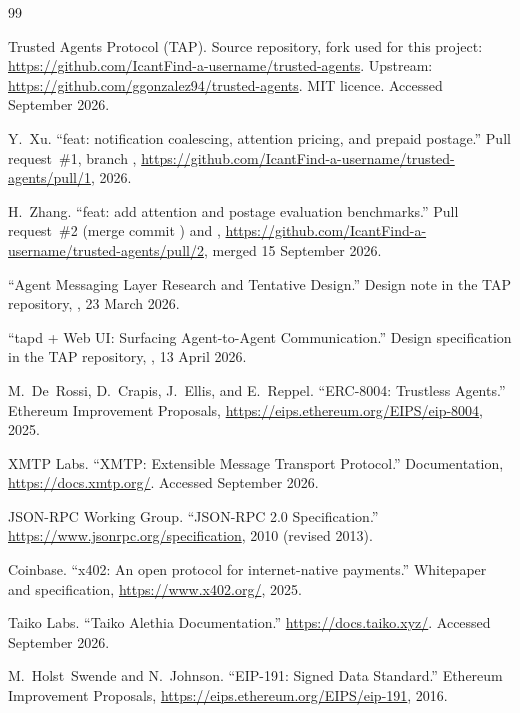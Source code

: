 \begin{thebibliography}{99}
\setlength{\itemsep}{2pt}
\small

Trusted Agents Protocol (TAP). Source repository, fork used for this project:
\url{https://github.com/IcantFind-a-username/trusted-agents}. Upstream:
\url{https://github.com/ggonzalez94/trusted-agents}. MIT licence. Accessed September 2026.

Y.~Xu. ``feat: notification coalescing, attention pricing, and prepaid postage.'' Pull
request~\#1, branch ,
\url{https://github.com/IcantFind-a-username/trusted-agents/pull/1}, 2026.

H.~Zhang. ``feat: add attention and postage evaluation benchmarks.'' Pull request~\#2
(merge commit ) and ,
\url{https://github.com/IcantFind-a-username/trusted-agents/pull/2}, merged 15 September 2026.

``Agent Messaging Layer Research and Tentative Design.'' Design note in the TAP repository,
, 23 March 2026.

``tapd + Web UI: Surfacing Agent-to-Agent Communication.'' Design specification in the TAP
repository, , 13 April 2026.

M.~De~Rossi, D.~Crapis, J.~Ellis, and E.~Reppel. ``ERC-8004: Trustless Agents.'' Ethereum
Improvement Proposals, \url{https://eips.ethereum.org/EIPS/eip-8004}, 2025.

XMTP Labs. ``XMTP: Extensible Message Transport Protocol.'' Documentation,
\url{https://docs.xmtp.org/}. Accessed September 2026.

JSON-RPC Working Group. ``JSON-RPC 2.0 Specification.''
\url{https://www.jsonrpc.org/specification}, 2010 (revised 2013).

Coinbase. ``x402: An open protocol for internet-native payments.'' Whitepaper and
specification, \url{https://www.x402.org/}, 2025.

Taiko Labs. ``Taiko Alethia Documentation.'' \url{https://docs.taiko.xyz/}. Accessed
September 2026.

M.~Holst~Swende and N.~Johnson. ``EIP-191: Signed Data Standard.'' Ethereum Improvement
Proposals, \url{https://eips.ethereum.org/EIPS/eip-191}, 2016.


\end{thebibliography}
